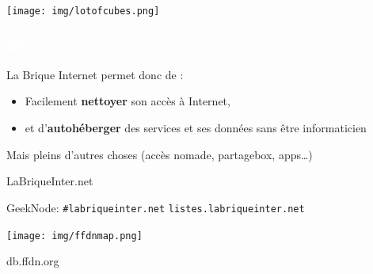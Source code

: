\documentclass[notes=hide]{beamer}
\begin{document}
\begin{frame}[t,plain]
\begin{center}
\vspace{\fill}
  \vspace{\fill}
\end{center}
\end{frame}

\begin{frame}[t,plain]
\begin{center}
  \vspace{\fill}
  \texttt{[image: img/lotofcubes.png]}
  \vspace{\fill}
\end{center}
\end{frame}

\begin{frame}[t]
\frametitle{\textcolor{white}{Bilan}}
  \begin{center}
    La Brique Internet permet donc de :
    \vfill
    \begin{itemize}
      \item Facilement \textbf{nettoyer} son accès à Internet,
      \item et d'\textbf{autohéberger} des services et ses données sans être informaticien
    \end{itemize}
    \end{center}
    \vfill
    Mais pleins d'autres choses (accès nomade, partagebox, apps…)
\end{frame}


\begin{frame}[t,plain]
\huge
\begin{center}
\vspace{\fill}
{\color{red}LaBrique}Inter.net

{\large GeekNode: \texttt{\#labriqueinter.net}}  {\large \texttt{listes.labriqueinter.net}}

\vspace{.4cm}
\texttt{[image: img/ffdnmap.png]}

\vspace{\fill}
db.{\color{ffdncolor}ffdn.org}
\vspace{\fill}
\end{center}
\end{frame}
\end{document}
